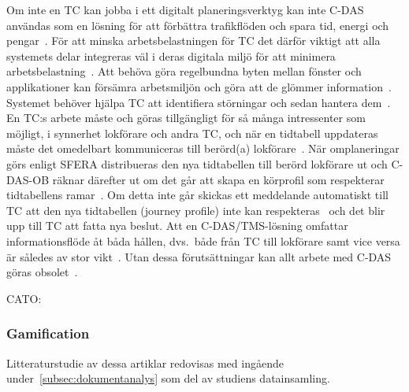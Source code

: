 Om inte en TC kan jobba i ett digitalt planeringsverktyg kan inte C-DAS användas som en lösning för att förbättra trafikflöden och spara tid, energi och pengar~\cite{Tschirner2013}.
För att minska arbetsbelastningen för TC det därför viktigt att alla systemets delar integreras väl i deras digitala miljö för att minimera arbetsbelastning~\cite{Tschirner2013}.
Att behöva göra regelbundna byten mellan fönster och applikationer kan försämra arbetsmiljön och göra att de glömmer information~\cite{Tschirner2013}.
Systemet behöver hjälpa TC att identifiera störningar och sedan hantera dem~\cite{Tschirner2013}.
En TC:s arbete måste och göras tillgängligt för så många intressenter som möjligt, i synnerhet lokförare och andra TC, och när en tidtabell uppdateras måste det omedelbart kommuniceras till berörd(a) lokförare~\cite{Tschirner2013}.
När omplaneringar görs enligt SFERA distribueras den nya tidtabellen till berörd lokförare ut och C-DAS-OB räknar därefter ut om det går att skapa en körprofil som respekterar tidtabellens ramar~\cite{Sfera-usecase-poster-2022}.
Om detta inte går skickas ett meddelande automatiskt till TC att den nya tidtabellen (journey profile) inte kan respekteras~\cite{Sfera-usecase-poster-2022} och det blir upp till TC att fatta nya beslut.
Att en C-DAS/TMS-lösning omfattar informationsflöde åt båda hållen, dvs.~både från TC till lokförare samt vice versa är således av stor vikt~\cite{Tschirner2013}.
Utan dessa förutsättningar kan allt arbete med C-DAS göras obsolet~\cite{Tschirner2013}.

CATO:
~\cite{Yang2013,Lindmark2022,Tschirner2013}

\subsubsection{Gamification}

Litteraturstudie av dessa artiklar redovisas med ingående under~\ref{subsec:dokumentanalys} som del av studiens datainsamling.